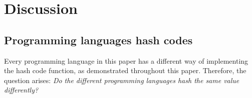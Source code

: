 \documentclass[titlepage]{article}
\begin{document}


%

\section{Discussion}

\subsection{Programming languages hash codes}
\label{disc:ProgrammingLangHashCodes}
Every programming language in this paper has a different way of implementing the hash code function, as demonstrated throughout this paper.
Therefore, the question arises: \textit{Do the different programming languages hash the same value differently?}
\end{document}
